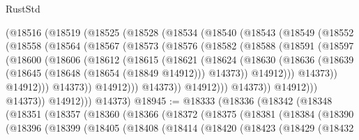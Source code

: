 \begin{lexlean}{RustStd}
\begin{coremodule}
          (@18516
            (@18519
              (@18525
                (@18528
                  (@18534
                    (@18540
                      (@18543
                        (@18549
                          (@18552
                            (@18558
                              (@18564
                                (@18567
                                  (@18573
                                    (@18576
                                      (@18582
                                        (@18588
                                          (@18591
                                            (@18597
                                              (@18600
                                                (@18606
                                                  (@18612
                                                    (@18615
                                                      (@18621
                                                        (@18624
                                                          (@18630
                                                            (@18636
                                                              (@18639
                                                                (@18645
                                                                  (@18648 (@18654 (@18849 @14912)))
                                                                  @14373))
                                                              @14912)))
                                                        @14373))
                                                    @14912)))
                                              @14373))
                                          @14912)))
                                    @14373))
                                @14912)))
                          @14373))
                      @14912)))
                @14373))
            @14912)))
      @14373)
@18945 := @18333
    (@18336
      (@18342
        (@18348
          (@18351
            (@18357
              (@18360
                (@18366
                  (@18372
                    (@18375
                      (@18381
                        (@18384
                          (@18390
                            (@18396
                              (@18399
                                (@18405
                                  (@18408
                                    (@18414
                                      (@18420
                                        (@18423
                                          (@18429
                                            (@18432

\end{coremodule}
\end{lexlean}
